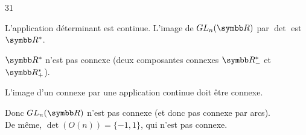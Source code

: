 \begin{correction}{31}

    L'application déterminant est continue.
    L'image de $GL_{n}(\R)$ par $\det$ est $\R^{*}$.

    $\R^{*}$ n'est pas connexe (deux composantes connexes $\R_{-}^{*}$ et $\R_{+}^{*}$).

    L'image d'un connexe par une application continue doit être connexe.

    Donc $GL_{n}(\R)$ n'est pas connexe (et donc pas connexe par arcs). \\

    De même, $\det(O(n)) = \{-1, 1\}$, qui n'est pas connexe.
\end{correction}
